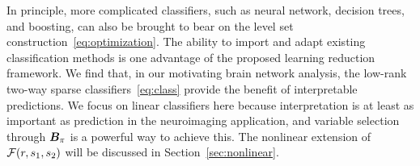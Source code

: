 \documentclass[12pt]{article}
\begin{document}
In principle, more complicated classifiers, such as neural network, decision trees, and boosting, can also be brought to bear on the level set construction~\eqref{eq:optimization}. The ability to import and adapt existing classification methods is one advantage of the proposed learning reduction framework. We find that, in our motivating brain network analysis, the low-rank two-way sparse classifiers~\eqref{eq:class} provide the benefit of interpretable predictions. We focus on linear classifiers here because interpretation is at least as important as prediction in the neuroimaging application, and variable selection through $\bm B_\pi$ is a powerful way to achieve this. The nonlinear extension of $\mathcal{F}(r,s_1,s_2)$ will be discussed in Section~\ref{sec:nonlinear}. 

\end{document}
